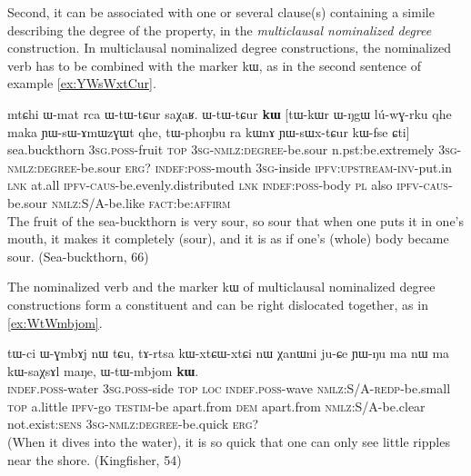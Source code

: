 \documentclass[oldfontcommands,oneside,a4paper,11pt]{article}
\newcommand{\ipa}[1]{{\phon #1}} %
\begin{document}
Second, it can be associated  with one or several  clause(s) containing a simile describing the degree of the property, in the \textit{multiclausal nominalized degree} construction. In multiclausal nominalized degree constructions, the nominalized verb has to be combined with the marker \ipa{kɯ}, as in the second sentence of example \ref{ex:YWsWxtCur}.




\begin{exe}
\ex \label{ex:YWsWxtCur}
\gll 
\ipa{mtɕhi}  	\ipa{ɯ-mat}  	\ipa{rca}  	\ipa{ɯ-tɯ-tɕur}  	\ipa{saχaʁ.}  	\ipa{ɯ-tɯ-tɕur}  	\ipa{\textbf{kɯ}}  	[\ipa{tɯ-kɯr}  	\ipa{ɯ-ŋgɯ}  	\ipa{lú-wɣ-rku}  	\ipa{qhe}  	\ipa{maka}  	\ipa{ɲɯ-sɯ-ɤmɯzɣɯt}  	\ipa{qhe,}  	\ipa{tɯ-phoŋbu}  	\ipa{ra}  	\ipa{kɯnɤ}  	\ipa{ɲɯ-sɯx-tɕur}  	\ipa{kɯ-fse}  	\ipa{ɕti}]  \\
sea.buckthorn \textsc{3sg.poss}-fruit \textsc{top} \textsc{3sg-nmlz:degree}-be.sour n.pst:be.extremely \textsc{3sg-nmlz:degree}-be.sour \textsc{erg?} \textsc{indef:poss}-mouth \textsc{3sg}-inside \textsc{ipfv:upstream-inv}-put.in \textsc{lnk} at.all \textsc{ipfv-caus}-be.evenly.distributed \textsc{lnk} \textsc{indef:poss}-body \textsc{pl} also \textsc{ipfv-caus}-be.sour \textsc{nmlz:S/A}-be.like \textsc{fact}:be:\textsc{affirm} \\
\glt The fruit of the sea-buckthorn is very sour, so sour that when one puts it in one's mouth, it makes it completely (sour), and it is as if one's (whole) body became sour. (Sea-buckthorn, 66)
\end{exe}

The nominalized verb and the marker \ipa{kɯ} of multiclausal  nominalized degree constructions form a constituent and can be right dislocated together, as in \ref{ex:WtWmbjom}.

 \begin{exe}
\ex \label{ex:WtWmbjom}
\gll 
\ipa{tɯ-ci}  	\ipa{ɯ-ɣmbɤj}  	\ipa{nɯ}  	\ipa{tɕu,}  	  	\ipa{tɤ-rtsa}  	\ipa{kɯ-xtɕɯ-xtɕi}  	\ipa{nɯ}  	\ipa{χanɯni}  	\ipa{ju-ɕe}  	\ipa{ɲɯ-ŋu}  	\ipa{ma}  	\ipa{nɯ}  	\ipa{ma}  	\ipa{kɯ-saχsɤl}  	\ipa{maŋe,}  	\ipa{ɯ-tɯ-mbjom}  	\ipa{\textbf{kɯ}.}  \\
\textsc{indef.poss}-water \textsc{3sg.poss}-side \textsc{top} \textsc{loc} \textsc{indef.poss}-wave \textsc{nmlz:S/A-redp}-be.small \textsc{top} a.little \textsc{ipfv}-go \textsc{testim}-be apart.from \textsc{dem} apart.from   \textsc{nmlz:S/A}-be.clear not.exist:\textsc{sens} \textsc{3sg-nmlz:degree}-be.quick \textsc{erg?} \\
\glt (When it dives into the water), it is so quick that one can only see little ripples near the shore.
 (Kingfisher, 54)
\end{exe}
\end{document}

